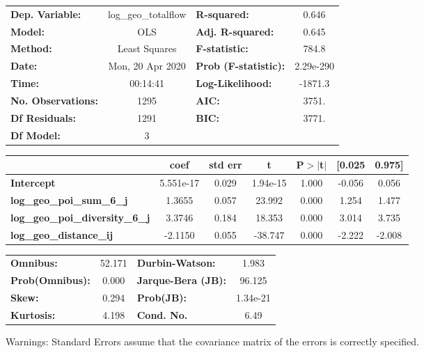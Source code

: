 \begin{center}
\begin{tabular}{lclc}
\toprule
\textbf{Dep. Variable:}                 & log\_geo\_totalflow & \textbf{  R-squared:         } &     0.646   \\
\textbf{Model:}                         &         OLS         & \textbf{  Adj. R-squared:    } &     0.645   \\
\textbf{Method:}                        &    Least Squares    & \textbf{  F-statistic:       } &     784.8   \\
\textbf{Date:}                          &   Mon, 20 Apr 2020  & \textbf{  Prob (F-statistic):} & 2.29e-290   \\
\textbf{Time:}                          &       00:14:41      & \textbf{  Log-Likelihood:    } &   -1871.3   \\
\textbf{No. Observations:}              &          1295       & \textbf{  AIC:               } &     3751.   \\
\textbf{Df Residuals:}                  &          1291       & \textbf{  BIC:               } &     3771.   \\
\textbf{Df Model:}                      &             3       & \textbf{                     } &             \\
\bottomrule
\end{tabular}
\begin{tabular}{lcccccc}
                                        & \textbf{coef} & \textbf{std err} & \textbf{t} & \textbf{P$> |$t$|$} & \textbf{[0.025} & \textbf{0.975]}  \\
\midrule
\textbf{Intercept}                      &    5.551e-17  &        0.029     &  1.94e-15  &         1.000        &       -0.056    &        0.056     \\
\textbf{log\_geo\_poi\_sum\_6\_j}       &       1.3655  &        0.057     &    23.992  &         0.000        &        1.254    &        1.477     \\
\textbf{log\_geo\_poi\_diversity\_6\_j} &       3.3746  &        0.184     &    18.353  &         0.000        &        3.014    &        3.735     \\
\textbf{log\_geo\_distance\_ij}         &      -2.1150  &        0.055     &   -38.747  &         0.000        &       -2.222    &       -2.008     \\
\bottomrule
\end{tabular}
\begin{tabular}{lclc}
\textbf{Omnibus:}       & 52.171 & \textbf{  Durbin-Watson:     } &    1.983  \\
\textbf{Prob(Omnibus):} &  0.000 & \textbf{  Jarque-Bera (JB):  } &   96.125  \\
\textbf{Skew:}          &  0.294 & \textbf{  Prob(JB):          } & 1.34e-21  \\
\textbf{Kurtosis:}      &  4.198 & \textbf{  Cond. No.          } &     6.49  \\
\bottomrule
\end{tabular}
\end{center}

Warnings: \newline
 [1] Standard Errors assume that the covariance matrix of the errors is correctly specified.